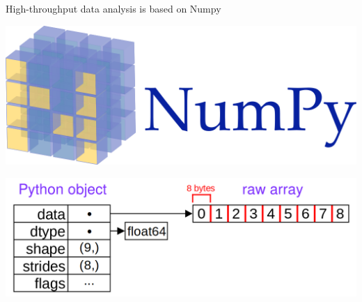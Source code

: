 \documentclass[aspectratio=169]{beamer}
\begin{document}
\begin{frame}{High-throughput data analysis is based on Numpy}
\vspace{0.5 cm}
\begin{center}
\includegraphics[width=0.35\linewidth]{numpy-logo.png}

\vspace{1 cm}
\includegraphics[width=0.75\linewidth]{numpy-memory-layout.png}
\end{center}
\end{frame}
\end{document}
